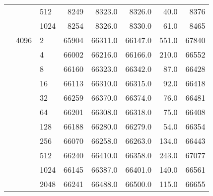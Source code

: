 \begin{tabular}{lllrrrrr}
           &      & 512  &                 8249 &   8323.0 &   8326.0 &   40.0 &   8376 \\
           &      & 1024 &                 8254 &   8326.0 &   8330.0 &   61.0 &   8465 \\
           & 4096 & 2    &                65904 &  66311.0 &  66147.0 &  551.0 &  67840 \\
           &      & 4    &                66002 &  66216.0 &  66166.0 &  210.0 &  66552 \\
           &      & 8    &                66160 &  66323.0 &  66342.0 &   87.0 &  66428 \\
           &      & 16   &                66113 &  66310.0 &  66315.0 &   92.0 &  66418 \\
           &      & 32   &                66259 &  66370.0 &  66374.0 &   76.0 &  66481 \\
           &      & 64   &                66201 &  66308.0 &  66318.0 &   75.0 &  66408 \\
           &      & 128  &                66188 &  66280.0 &  66279.0 &   54.0 &  66354 \\
           &      & 256  &                66070 &  66258.0 &  66263.0 &  134.0 &  66443 \\
           &      & 512  &                66240 &  66410.0 &  66358.0 &  243.0 &  67077 \\
           &      & 1024 &                66145 &  66387.0 &  66401.0 &  140.0 &  66561 \\
           &      & 2048 &                66241 &  66488.0 &  66500.0 &  115.0 &  66655 \\
\bottomrule
\end{tabular}
